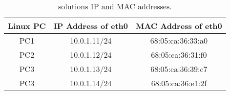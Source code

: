 \begin{table}[h!t]
	\centering
	\begin{tabular}{| c | c | c |}	
		\hline
		\textbf{Linux PC} & \textbf{IP Address of eth0} & \textbf{MAC Address of eth0} \\ \hline
		PC1 & 10.0.1.11/24 & 68:05:ca:36:33:a0 \\ 
		PC2 & 10.0.1.12/24 & 68:05:ca:36:31:f0 \\
		PC3 & 10.0.1.13/24 & 68:05:ca:36:39:c7 \\
		PC3 & 10.0.1.14/24 & 68:05:ca:36:e1:2f \\ \hline
	\end{tabular}
	\caption{ solutions IP and MAC addresses.}
	\label{tab:lab2-ip-to-mac-sol}
\end{table}